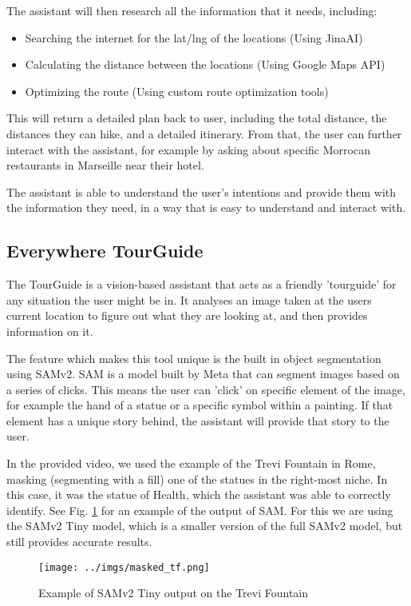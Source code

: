 \documentclass{article}
\begin{document}
The assistant will then research all the information that it needs, including:

\begin{itemize}
\item Searching the internet for the lat/lng of the locations (Using JinaAI)
\item Calculating the distance between the locations (Using Google Maps API)
\item Optimizing the route (Using custom route optimization tools)
\end{itemize}

This will return a detailed plan back to user, including the total distance, the distances they can hike, and a detailed itinerary. From that, the user can further interact with the assistant, for example by asking about specific Morrocan restaurants in Marseille near their hotel.

The assistant is able to understand the user's intentions and provide them with the information they need, in a way that is easy to understand and interact with.

\subsection{Everywhere TourGuide}

The TourGuide is a vision-based assistant that acts as a friendly 'tourguide' for any situation the user might be in. It analyses an image taken at the users current location to figure out what they are looking at, and then provides information on it.

The feature which makes this tool unique is the built in object segmentation using SAMv2. SAM is a model built by Meta that can segment images based on a series of clicks. This means the user can 'click' on specific element of the image, for example the hand of a statue or a specific symbol within a painting. If that element has a unique story behind, the assistant will provide that story to the user.

In the provided video, we used the example of the Trevi Fountain in Rome, masking (segmenting with a fill) one of the statues in the right-most niche. In this case, it was the statue of Health, which the assistant was able to correctly identify. See Fig. \ref{fig:mask} for an example of the output of SAM. For this we are using the SAMv2 Tiny model, which is a smaller version of the full SAMv2 model, but still provides accurate results.

\begin{figure}
    \centering
    \texttt{[image: ../imgs/masked\_tf.png]}
    \caption{Example of SAMv2 Tiny output on the Trevi Fountain}
    \label{fig:mask}
\end{figure}
\end{document}
